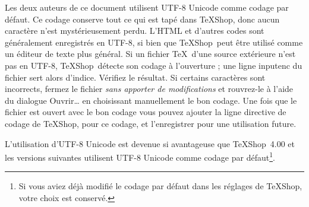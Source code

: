 \documentclass[11pt,french]{article}
\newcommand{\TS}{\textsf{\TeX Shop}}
\newcommand{\acr}[1]{\textsf{#1}}
\newcommand{\cmd}[1]{\textsf{#1}}
\begin{document}
Les deux auteurs de ce document utilisent \acr{UTF-8 Unicode} comme codage par défaut. Ce codage conserve tout ce qui est tapé dans \TS, donc aucun caractère n'est mystérieusement perdu. L'HTML et d'autres codes sont généralement enregistrés en \acr{UTF-8}, si bien que \TS\ peut être utilisé comme un éditeur de texte plus général. Si un fichier \TeX\ d'une source extérieure n'est pas en \acr{UTF-8}, \TS\ détecte son codage à l'ouverture ; une ligne \cmd{inputenc} du fichier sert alors d'indice. Vérifiez le résultat. Si certains caractères sont incorrects, fermez le fichier \emph{sans apporter de modifications} et rouvrez-le à l'aide du dialogue \cmd{Ouvrir…} en choisissant manuellement le bon codage. Une fois que le fichier est ouvert avec le bon codage vous pouvez ajouter la ligne directive de codage de \TS, pour ce codage, et l'enregistrer pour une utilisation future.

L'utilisation d'\acr{UTF-8 Unicode} est devenue si avantageuse que \TS\ 4.00 et les versions suivantes utilisent \acr{UTF-8 Unicode} comme codage par défaut\footnote{Si vous aviez déjà modifié le codage par défaut dans les réglages de \TS, votre choix est conservé.}.
\end{document}
